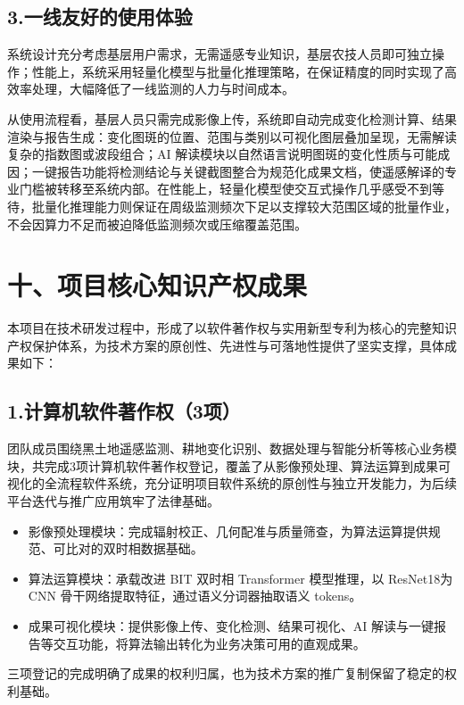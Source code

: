 \documentclass[12pt, a4paper]{ctexart}
\begin{document}
\subsection{3.一线友好的使用体验}

系统设计充分考虑基层用户需求，无需遥感专业知识，基层农技人员即可独立操作；性能上，系统采用轻量化模型与批量化推理策略，在保证精度的同时实现了高效率处理，大幅降低了一线监测的人力与时间成本。

从使用流程看，基层人员只需完成影像上传，系统即自动完成变化检测计算、结果渲染与报告生成：变化图斑的位置、范围与类别以可视化图层叠加呈现，无需解读复杂的指数图或波段组合；AI 解读模块以自然语言说明图斑的变化性质与可能成因；一键报告功能将检测结论与关键截图整合为规范化成果文档，使遥感解译的专业门槛被转移至系统内部。在性能上，轻量化模型使交互式操作几乎感受不到等待，批量化推理能力则保证在周级监测频次下足以支撑较大范围区域的批量作业，不会因算力不足而被迫降低监测频次或压缩覆盖范围。

\section{十、项目核心知识产权成果}

本项目在技术研发过程中，形成了以软件著作权与实用新型专利为核心的完整知识产权保护体系，为技术方案的原创性、先进性与可落地性提供了坚实支撑，具体成果如下：

\subsection{1.计算机软件著作权（3项）}

团队成员围绕黑土地遥感监测、耕地变化识别、数据处理与智能分析等核心业务模块，共完成3项计算机软件著作权登记，覆盖了从影像预处理、算法运算到成果可视化的全流程软件系统，充分证明项目软件系统的原创性与独立开发能力，为后续平台迭代与推广应用筑牢了法律基础。

\begin{itemize}
    \item 影像预处理模块：完成辐射校正、几何配准与质量筛查，为算法运算提供规范、可比对的双时相数据基础。
    \item 算法运算模块：承载改进 BIT 双时相 Transformer 模型推理，以 ResNet18为 CNN 骨干网络提取特征，通过语义分词器抽取语义 tokens。
    \item 成果可视化模块：提供影像上传、变化检测、结果可视化、AI 解读与一键报告等交互功能，将算法输出转化为业务决策可用的直观成果。
\end{itemize}

三项登记的完成明确了成果的权利归属，也为技术方案的推广复制保留了稳定的权利基础。
\end{document}
